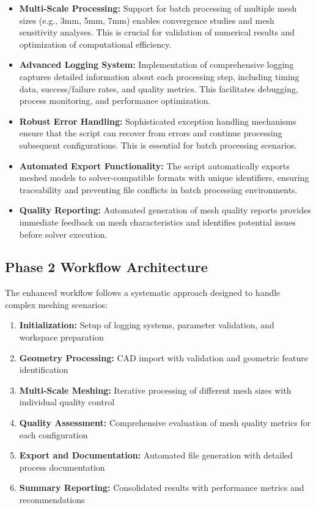 \documentclass{book}
\begin{document}
\begin{itemize}[leftmargin=*,label=\textbullet]
\begin{itemize}[leftmargin=*,label=\textbullet]
    \item \textbf{Multi-Scale Processing:} Support for batch processing of multiple mesh sizes (e.g., 3mm, 5mm, 7mm) enables convergence studies and mesh sensitivity analyses. This is crucial for validation of numerical results and optimization of computational efficiency.
    
    \item \textbf{Advanced Logging System:} Implementation of comprehensive logging captures detailed information about each processing step, including timing data, success/failure rates, and quality metrics. This facilitates debugging, process monitoring, and performance optimization.
    
    \item \textbf{Robust Error Handling:} Sophisticated exception handling mechanisms ensure that the script can recover from errors and continue processing subsequent configurations. This is essential for batch processing scenarios.
    
    \item \textbf{Automated Export Functionality:} The script automatically exports meshed models to solver-compatible formats with unique identifiers, ensuring traceability and preventing file conflicts in batch processing environments.
    
    \item \textbf{Quality Reporting:} Automated generation of mesh quality reports provides immediate feedback on mesh characteristics and identifies potential issues before solver execution.
\end{itemize}

\subsection{Phase 2 Workflow Architecture}

The enhanced workflow follows a systematic approach designed to handle complex meshing scenarios:

\begin{enumerate}
    \item \textbf{Initialization:} Setup of logging systems, parameter validation, and workspace preparation
    \item \textbf{Geometry Processing:} CAD import with validation and geometric feature identification
    \item \textbf{Multi-Scale Meshing:} Iterative processing of different mesh sizes with individual quality control
    \item \textbf{Quality Assessment:} Comprehensive evaluation of mesh quality metrics for each configuration
    \item \textbf{Export and Documentation:} Automated file generation with detailed process documentation
    \item \textbf{Summary Reporting:} Consolidated results with performance metrics and recommendations
\end{enumerate}


\end{itemize}
\end{document}
